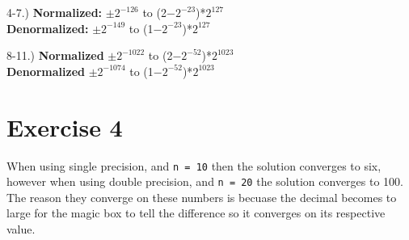 \documentclass{article}
\begin{document}
\begin{comment}
4.) %
\textbf{Smallest:}\texttt{1*$2^{126}$} \textbf{Largest:}\texttt{(2-$2^{-23}$)*$2^{127}$}


5.) %
\textbf{Smallest:}\texttt{-(2-$2^{-23}$)*$2^{127}$} \textbf{Largest:}\texttt{-1*$2^{126}$}

6.) %
\textbf{Smallest:}\texttt{$2^{-23}$*$2^{-126}$} \textbf{Largest:}\texttt{stuff}

7.) %
\textbf{Smallest:}\texttt{stuff} \textbf{Largest:}\texttt{$-2^{-23}$*$2^{-126}$}

8.) %
\textbf{Smallest:}\texttt{1*$2^{-1022}$} \textbf{Largest:}\texttt{-(2-$2^{-52}$)*$2^{1023}$}

9.) %
\textbf{Smallest:}\texttt{-(2-$2^{-52}$)*$2^{1023}$} \textbf{Largest:}\texttt{-1*$2^{-1022}$}


10.) %
\textbf{Smallest:}\texttt{$2^{-52}$*$2^{-1022}$} \textbf{Largest:}\texttt{stuff}


11.) %
\textbf{Smallest:}\texttt{stuff} \textbf{Largest:}\texttt{$-2^{-52}$*$2^{-1022}$}

\end{comment}



4-7.)
\textbf{Normalized:} $\pm 2^{-126}$ to (2$-2^{-23}$)*$2^{127}$ \\
\textbf{Denormalized:} $\pm 2^{-149}$ to (1$-2^{-23}$)*$2^{127}$

8-11.)
\textbf{Normalized} $\pm 2^{-1022}$ to (2$-2^{-52}$)*$2^{1023}$ \\
\textbf{Denormalized} $\pm 2^{-1074}$ to (1$-2^{-52}$)*$2^{1023}$


\newpage
\section{Exercise 4}

When using single precision, and \texttt{n = 10} then the solution converges to six, however when using double precision, and \texttt{n = 20} the solution converges to 100. The reason they converge on these numbers is becuase the decimal becomes to large for the magic box to tell the difference so it converges on its respective value.
\end{document}
